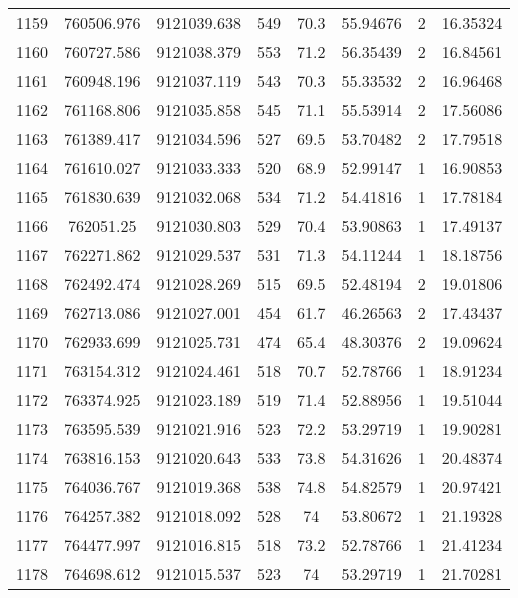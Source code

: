 \begin{longtable}{cccccccc}
1159 & 760506.976      & 9121039.638      & 549     & 70.3  & 55.94676 & 2  & 16.35324 \\
1160 & 760727.586      & 9121038.379      & 553     & 71.2  & 56.35439 & 2  & 16.84561 \\
1161 & 760948.196      & 9121037.119      & 543     & 70.3  & 55.33532 & 2  & 16.96468 \\
1162 & 761168.806      & 9121035.858      & 545     & 71.1  & 55.53914 & 2  & 17.56086 \\
1163 & 761389.417      & 9121034.596      & 527     & 69.5  & 53.70482 & 2  & 17.79518 \\
1164 & 761610.027      & 9121033.333      & 520     & 68.9  & 52.99147 & 1  & 16.90853 \\
1165 & 761830.639      & 9121032.068      & 534     & 71.2  & 54.41816 & 1  & 17.78184 \\
1166 & 762051.25       & 9121030.803      & 529     & 70.4  & 53.90863 & 1  & 17.49137 \\
1167 & 762271.862      & 9121029.537      & 531     & 71.3  & 54.11244 & 1  & 18.18756 \\
1168 & 762492.474      & 9121028.269      & 515     & 69.5  & 52.48194 & 2  & 19.01806 \\
1169 & 762713.086      & 9121027.001      & 454     & 61.7  & 46.26563 & 2  & 17.43437 \\
1170 & 762933.699      & 9121025.731      & 474     & 65.4  & 48.30376 & 2  & 19.09624 \\
1171 & 763154.312      & 9121024.461      & 518     & 70.7  & 52.78766 & 1  & 18.91234 \\
1172 & 763374.925      & 9121023.189      & 519     & 71.4  & 52.88956 & 1  & 19.51044 \\
1173 & 763595.539      & 9121021.916      & 523     & 72.2  & 53.29719 & 1  & 19.90281 \\
1174 & 763816.153      & 9121020.643      & 533     & 73.8  & 54.31626 & 1  & 20.48374 \\
1175 & 764036.767      & 9121019.368      & 538     & 74.8  & 54.82579 & 1  & 20.97421 \\
1176 & 764257.382      & 9121018.092      & 528     & 74    & 53.80672 & 1  & 21.19328 \\
1177 & 764477.997      & 9121016.815      & 518     & 73.2  & 52.78766 & 1  & 21.41234 \\
1178 & 764698.612      & 9121015.537      & 523     & 74    & 53.29719 & 1  & 21.70281 \\

\end{longtable}
